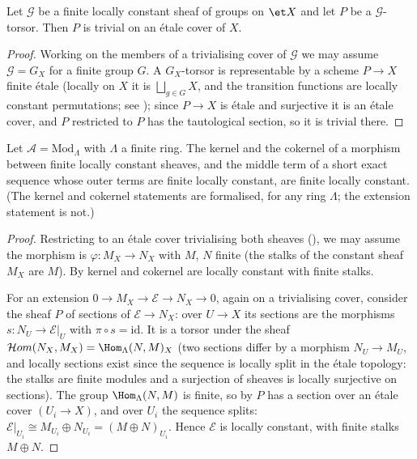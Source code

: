 \begin{lemma}
\label{lemma:constructible-torsor-trivialises}
Let $\mathcal G$ be a finite locally constant sheaf of groups on $\et X$
and let $P$ be a $\mathcal G$-torsor.  Then $P$ is trivial on an \'etale
cover of $X$.
\end{lemma}
\begin{proof}
Working on the members of a trivialising cover of $\mathcal G$ we may
assume $\mathcal G=G_X$ for a finite group $G$.  A $G_X$-torsor is
representable by a scheme $P\to X$ finite \'etale (locally on $X$ it is
$\bigsqcup_{g\in G}X$, and the transition functions are locally constant
permutations; see \cite[Exp.~IX, 2.1]{SGA4}); since $P\to X$ is \'etale and
surjective it is an \'etale cover, and $P$ restricted to $P$ has the
tautological section, so it is trivial there.
\end{proof}

\begin{lemma}
\label{lemma:constructible-flc-serre}
Let $\mathcal A=\mathrm{Mod}_\Lambda$ with $\Lambda$ a finite ring.  The
kernel and the cokernel of a morphism between finite locally constant
sheaves, and the middle term of a short exact sequence whose outer terms
are finite locally constant, are finite locally constant.  (The kernel and
cokernel statements are formalised, for any ring $\Lambda$; the extension
statement is not.)
\end{lemma}
\begin{proof}
Restricting to an \'etale cover trivialising both sheaves
(), we may assume the morphism is
$\varphi\colon M_X\to N_X$ with $M$, $N$ finite (the stalks of the constant
sheaf $M_X$ are $M$).  By 
kernel and cokernel are locally constant with finite stalks.

For an extension $0\to M_X\to\mathcal E\to N_X\to0$, again on a
trivialising cover, consider the sheaf $P$ of sections of
$\mathcal E\to N_X$: over $U\to X$ its sections are the morphisms
$s\colon N_U\to\mathcal E|_U$ with $\pi\circ s=\mathrm{id}$.  It is a torsor
under the sheaf $\mathcal{H}om(N_X,M_X)=\Hom_\Lambda(N,M)_X$ (two sections
differ by a morphism $N_U\to M_U$, and locally sections exist since the
sequence is locally split in the \'etale topology: the stalks are finite
modules and a surjection of sheaves is locally surjective on sections).
The group $\Hom_\Lambda(N,M)$ is finite, so by
 $P$ has a section over an
\'etale cover $(U_i\to X)$, and over $U_i$ the sequence splits:
$\mathcal E|_{U_i}\cong M_{U_i}\oplus N_{U_i}=(M\oplus N)_{U_i}$.  Hence
$\mathcal E$ is locally constant, with finite stalks $M\oplus N$.
\end{proof}


